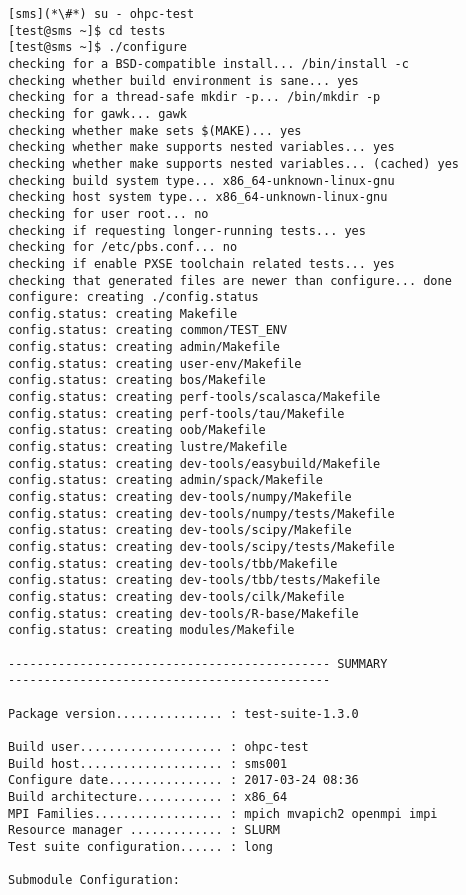 \begin{lstlisting}
[sms](*\#*) su - ohpc-test
[test@sms ~]$ cd tests
[test@sms ~]$ ./configure
checking for a BSD-compatible install... /bin/install -c
checking whether build environment is sane... yes
checking for a thread-safe mkdir -p... /bin/mkdir -p
checking for gawk... gawk
checking whether make sets $(MAKE)... yes
checking whether make supports nested variables... yes
checking whether make supports nested variables... (cached) yes
checking build system type... x86_64-unknown-linux-gnu
checking host system type... x86_64-unknown-linux-gnu
checking for user root... no
checking if requesting longer-running tests... yes
checking for /etc/pbs.conf... no
checking if enable PXSE toolchain related tests... yes
checking that generated files are newer than configure... done
configure: creating ./config.status
config.status: creating Makefile
config.status: creating common/TEST_ENV
config.status: creating admin/Makefile
config.status: creating user-env/Makefile
config.status: creating bos/Makefile
config.status: creating perf-tools/scalasca/Makefile
config.status: creating perf-tools/tau/Makefile
config.status: creating oob/Makefile
config.status: creating lustre/Makefile
config.status: creating dev-tools/easybuild/Makefile
config.status: creating admin/spack/Makefile
config.status: creating dev-tools/numpy/Makefile
config.status: creating dev-tools/numpy/tests/Makefile
config.status: creating dev-tools/scipy/Makefile
config.status: creating dev-tools/scipy/tests/Makefile
config.status: creating dev-tools/tbb/Makefile
config.status: creating dev-tools/tbb/tests/Makefile
config.status: creating dev-tools/cilk/Makefile
config.status: creating dev-tools/R-base/Makefile
config.status: creating modules/Makefile

--------------------------------------------- SUMMARY
---------------------------------------------

Package version............... : test-suite-1.3.0

Build user.................... : ohpc-test
Build host.................... : sms001
Configure date................ : 2017-03-24 08:36
Build architecture............ : x86_64
MPI Families.................. : mpich mvapich2 openmpi impi
Resource manager ............. : SLURM
Test suite configuration...... : long

Submodule Configuration:


\end{lstlisting}
